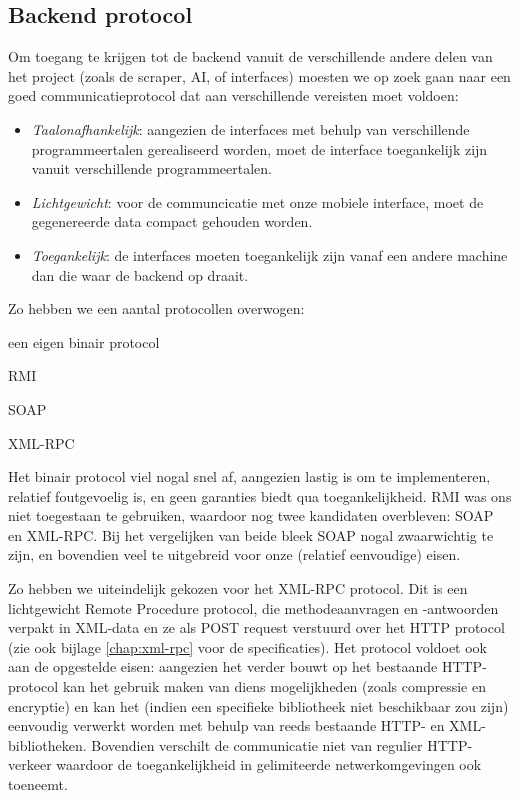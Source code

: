 \subsection{Backend protocol}

Om toegang te krijgen tot de backend vanuit de verschillende andere delen van het project (zoals de scraper, AI, of interfaces) moesten we op zoek gaan naar een goed communicatieprotocol dat aan verschillende vereisten moet voldoen:
\begin{itemize}
\item{\emph{Taalonafhankelijk}: aangezien de interfaces met behulp van verschillende programmeertalen gerealiseerd worden, moet de interface toegankelijk zijn vanuit verschillende programmeertalen.}
\item{\emph{Lichtgewicht}: voor de communcicatie met onze mobiele interface, moet de gegenereerde data compact gehouden worden.}
\item{\emph{Toegankelijk}: de interfaces moeten toegankelijk zijn vanaf een andere machine dan die waar de backend op draait.}
\end{itemize}

Zo hebben we een aantal protocollen overwogen:
\begin{itemize_compact}
\item{een eigen binair protocol}
\item{RMI}
\item{SOAP}
\item{XML-RPC}
\end{itemize_compact}

Het binair protocol viel nogal snel af, aangezien lastig is om te implementeren, relatief foutgevoelig is, en geen garanties biedt qua toegankelijkheid. RMI was ons niet toegestaan te gebruiken, waardoor nog twee kandidaten overbleven: SOAP en XML-RPC. Bij het vergelijken van beide bleek SOAP nogal zwaarwichtig te zijn, en bovendien veel te uitgebreid voor onze (relatief eenvoudige) eisen.

Zo hebben we uiteindelijk gekozen voor het XML-RPC protocol. Dit is een lichtgewicht Remote Procedure protocol, die methodeaanvragen en -antwoorden verpakt in XML-data en ze als POST request verstuurd over het HTTP protocol (zie ook bijlage \ref{chap:xml-rpc} voor de specificaties).
Het protocol voldoet ook aan de opgestelde eisen: aangezien het verder bouwt op het bestaande HTTP-protocol kan het gebruik maken van diens mogelijkheden (zoals compressie en encryptie) en kan het (indien een specifieke bibliotheek niet beschikbaar zou zijn) eenvoudig verwerkt worden met behulp van reeds bestaande HTTP- en XML-bibliotheken. Bovendien verschilt de communicatie niet van regulier HTTP-verkeer waardoor de toegankelijkheid in gelimiteerde netwerkomgevingen ook toeneemt.

